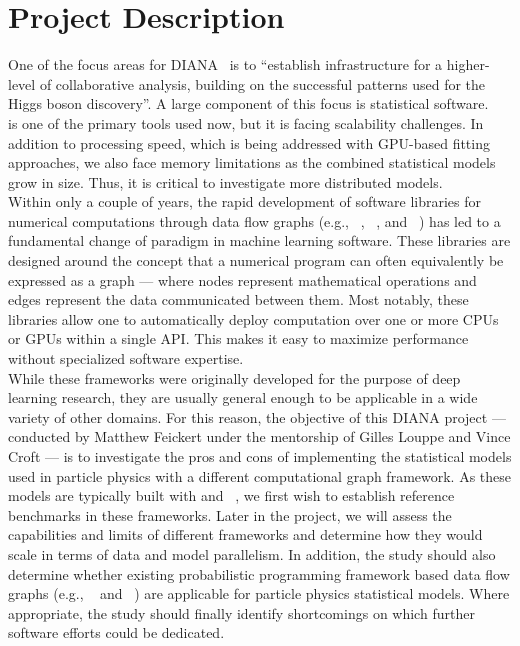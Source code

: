 \section{Project Description}

One of the focus areas for DIANA~\cite{DIANA-proposal-2014} is to ``establish infrastructure for a higher-level of collaborative analysis, building on the successful patterns used for the Higgs boson discovery''.
A large component of this focus is statistical software.
~\cite{Verkerke:2003ir} is one of the primary tools used now, but it is facing scalability challenges.
In addition to processing speed, which is being addressed with GPU-based fitting approaches, we also face memory limitations as the combined statistical models grow in size.
Thus, it is critical to investigate more distributed models.\\

Within only a couple of years, the rapid development of software libraries for numerical computations through data flow graphs (e.g., ~\cite{tensorflow2015-whitepaper}, ~\cite{theano-full}, and ~\cite{DBLP:journals/corr/ChenLLLWWXXZZ15}) has led to a fundamental change of paradigm in machine learning software.
These libraries are designed around the concept that a numerical program can often equivalently be expressed as a graph --- where nodes represent mathematical operations and edges represent the data communicated between them.
Most notably, these libraries allow one to automatically deploy computation over one or more CPUs or GPUs within a single API. This makes it easy to maximize performance without specialized software expertise.\\

While these frameworks were originally developed for the purpose of deep learning research, they are usually general enough to be applicable in a wide variety of other domains.
For this reason, the objective of this DIANA project --- conducted by Matthew Feickert under the mentorship of Gilles Louppe and Vince Croft --- is to investigate the pros and cons of implementing the statistical models used in particle physics with a different computational graph framework.
As these models are typically built with  and ~\cite{Cranmer:2012sba}, we first wish to establish reference benchmarks in these frameworks.
Later in the project, we will assess the capabilities and limits of different frameworks and determine how they would scale in terms of data and model parallelism.
In addition, the study should also determine whether existing probabilistic programming framework based data flow graphs (e.g., ~\cite{tran2016edward} and ~\cite{tensorprob2016}) are applicable for particle physics statistical models.
Where appropriate, the study should finally identify shortcomings on which further software efforts could be dedicated.\\

